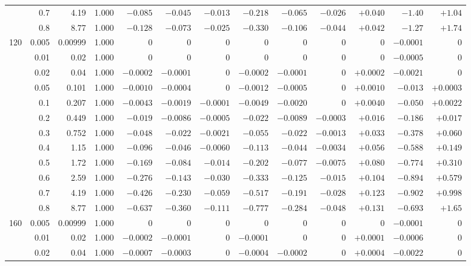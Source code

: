 \documentclass[11pt,a4paper]{article}
\begin{document}
\begin{table}[htbp]
\begin{tabular}{rrrrrrrrrrrrr}
 & 0.7 & 4.19 & 1.000 & $-0.085$ & $-0.045$ & $-0.013$ & $-0.218$ & $-0.065$ & $-0.026$ & $+0.040$ & $-1.40$ & $+1.04$ \\
 & 0.8 & 8.77 & 1.000 & $-0.128$ & $-0.073$ & $-0.025$ & $-0.330$ & $-0.106$ & $-0.044$ & $+0.042$ & $-1.27$ & $+1.74$ \\
\midrule
120 & 0.005 & 0.00999 & 1.000 & $0$ & $0$ & $0$ & $0$ & $0$ & $0$ & $0$ & $-0.0001$ & $0$ \\
 & 0.01 & 0.02 & 1.000 & $0$ & $0$ & $0$ & $0$ & $0$ & $0$ & $0$ & $-0.0005$ & $0$ \\
 & 0.02 & 0.04 & 1.000 & $-0.0002$ & $-0.0001$ & $0$ & $-0.0002$ & $-0.0001$ & $0$ & $+0.0002$ & $-0.0021$ & $0$ \\
 & 0.05 & 0.101 & 1.000 & $-0.0010$ & $-0.0004$ & $0$ & $-0.0012$ & $-0.0005$ & $0$ & $+0.0010$ & $-0.013$ & $+0.0003$ \\
 & 0.1 & 0.207 & 1.000 & $-0.0043$ & $-0.0019$ & $-0.0001$ & $-0.0049$ & $-0.0020$ & $0$ & $+0.0040$ & $-0.050$ & $+0.0022$ \\
 & 0.2 & 0.449 & 1.000 & $-0.019$ & $-0.0086$ & $-0.0005$ & $-0.022$ & $-0.0089$ & $-0.0003$ & $+0.016$ & $-0.186$ & $+0.017$ \\
 & 0.3 & 0.752 & 1.000 & $-0.048$ & $-0.022$ & $-0.0021$ & $-0.055$ & $-0.022$ & $-0.0013$ & $+0.033$ & $-0.378$ & $+0.060$ \\
 & 0.4 & 1.15 & 1.000 & $-0.096$ & $-0.046$ & $-0.0060$ & $-0.113$ & $-0.044$ & $-0.0034$ & $+0.056$ & $-0.588$ & $+0.149$ \\
 & 0.5 & 1.72 & 1.000 & $-0.169$ & $-0.084$ & $-0.014$ & $-0.202$ & $-0.077$ & $-0.0075$ & $+0.080$ & $-0.774$ & $+0.310$ \\
 & 0.6 & 2.59 & 1.000 & $-0.276$ & $-0.143$ & $-0.030$ & $-0.333$ & $-0.125$ & $-0.015$ & $+0.104$ & $-0.894$ & $+0.579$ \\
 & 0.7 & 4.19 & 1.000 & $-0.426$ & $-0.230$ & $-0.059$ & $-0.517$ & $-0.191$ & $-0.028$ & $+0.123$ & $-0.902$ & $+0.998$ \\
 & 0.8 & 8.77 & 1.000 & $-0.637$ & $-0.360$ & $-0.111$ & $-0.777$ & $-0.284$ & $-0.048$ & $+0.131$ & $-0.693$ & $+1.65$ \\
\midrule
160 & 0.005 & 0.00999 & 1.000 & $0$ & $0$ & $0$ & $0$ & $0$ & $0$ & $0$ & $-0.0001$ & $0$ \\
 & 0.01 & 0.02 & 1.000 & $-0.0002$ & $-0.0001$ & $0$ & $-0.0001$ & $0$ & $0$ & $+0.0001$ & $-0.0006$ & $0$ \\
 & 0.02 & 0.04 & 1.000 & $-0.0007$ & $-0.0003$ & $0$ & $-0.0004$ & $-0.0002$ & $0$ & $+0.0004$ & $-0.0022$ & $0$ \\

\end{tabular}
\end{table}
\end{document}
